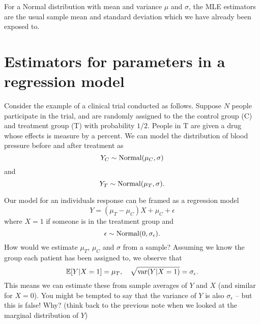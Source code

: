 For a Normal distribution with mean and variance $\mu$ and $\sigma$, the MLE estimators are the usual sample mean and standard deviation which we have already been exposed to. 


\section{Estimators for parameters in a regression model}

Consider the example of a clinical trial conducted as follows. Suppose $N$ people participate in the trial, and are randomly assigned to the the control group (C) and treatment group (T) with probability $1/2$. People in T are given a drug whose effects is measure by a percent.  We can model the distribution of blood pressure before and after treatment as 
\begin{equation}
Y_C \sim {\rm Normal}(\mu_C,\sigma)
\end{equation}
and 
\begin{equation}
Y_T \sim {\rm Normal}(\mu_T,\sigma).
\end{equation}

Our model for an individuals response can be framed as a regression model 
\begin{equation}\label{eq:clinical}
Y  = (\mu_T-\mu_C)X + \mu_C + \epsilon
\end{equation}
where $X=1$ if someone is in the treatment group and 
\begin{equation}
\epsilon \sim {\rm Normal}(0,\sigma_{\epsilon}). 
\end{equation}
How would we estimate $\mu_T$, $\mu_C$ and $\sigma$ from a sample? Assuming we know the group each patient has been assigned to, we observe that 
\begin{equation}
\mathbb E[Y|X=1] = \mu_T,\quad  \sqrt{{\rm var}(Y|X=1)} = \sigma_{\epsilon}. 
\end{equation}
This means we can estimate these from sample averages of $Y$ and $X$ (and similar for $X=0$). You might be tempted to say that the variance of $Y$ is also $\sigma_{\epsilon}$ -- but this is false! Why? (think back to the previous note when we looked at the marginal distribution of $Y$)








